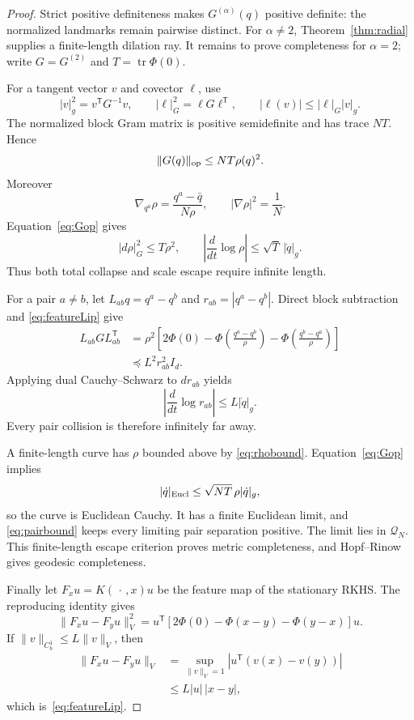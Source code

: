 \documentclass[11pt]{article}
\newcommand{\Q}{\mathcal{Q}}
\begin{document}
\begin{proof}
Strict positive definiteness makes \(G^{(\alpha)}(q)\) positive definite:
the normalized landmarks remain pairwise distinct.  For \(\alpha\ne2\),
Theorem~\ref{thm:radial} supplies a finite-length dilation ray.  It remains
to prove completeness for \(\alpha=2\); write \(G=G^{(2)}\) and
\(T=\operatorname{tr}\Phi(0)\).

For a tangent vector \(v\) and covector \(\ell\), use
\[
 |v|_g^2=v^{\mathsf T}G^{-1}v,
 \qquad |\ell|_G^2=\ell G\ell^{\mathsf T},
 \qquad |\ell(v)|\le |\ell|_G|v|_g.
\]
The normalized block Gram matrix is positive semidefinite and has trace
\(NT\).  Hence
\begin{equation}
 \|G(q)\|_{\rm op}\le NT\rho(q)^2.
 \label{eq:Gop}
\end{equation}
Moreover
\[
 \nabla_{q^a}\rho=\frac{q^a-\bar q}{N\rho},
 \qquad |\nabla\rho|^2=\frac1N.
\]
Equation~\eqref{eq:Gop} gives
\begin{equation}
 |d\rho|_G^2\le T\rho^2,
 \qquad
 \left|\frac d{dt}\log\rho\right|
 \le\sqrt T\,|\dot q|_g.
 \label{eq:rhobound}
\end{equation}
Thus both total collapse and scale escape require infinite length.

For a pair \(a\ne b\), let \(L_{ab}q=q^a-q^b\) and
\(r_{ab}=|q^a-q^b|\).  Direct block subtraction and
\eqref{eq:featureLip} give
\[
\begin{aligned}
 L_{ab}GL_{ab}^{\mathsf T}
 &=\rho^2\left[
 2\Phi(0)-\Phi\left(\frac{q^a-q^b}{\rho}\right)
 -\Phi\left(\frac{q^b-q^a}{\rho}\right)\right]\\
 &\preccurlyeq L^2r_{ab}^2I_d.
\end{aligned}
\]
Applying dual Cauchy--Schwarz to \(dr_{ab}\) yields
\begin{equation}
 \left|\frac d{dt}\log r_{ab}\right|
 \le L|\dot q|_g.
 \label{eq:pairbound}
\end{equation}
Every pair collision is therefore infinitely far away.

A finite-length curve has \(\rho\) bounded above by
\eqref{eq:rhobound}.  Equation~\eqref{eq:Gop} implies
\[
 |\dot q|_{\rm Eucl}
 \le\sqrt{NT}\,\rho|\dot q|_g,
\]
so the curve is Euclidean Cauchy.  It has a finite Euclidean limit, and
\eqref{eq:pairbound} keeps every limiting pair separation positive.  The
limit lies in \(\Q_N\).  This finite-length escape criterion proves metric
completeness, and Hopf--Rinow gives geodesic completeness.

Finally let \(F_xu=K(\,\cdot\,,x)u\) be the feature map of the stationary
RKHS.  The reproducing identity gives
\[
 \|F_xu-F_yu\|_V^2
 =u^{\mathsf T}
 [2\Phi(0)-\Phi(x-y)-\Phi(y-x)]u.
\]
If \(\|v\|_{C_b^1}\le L\|v\|_V\), then
\[
\begin{aligned}
 \|F_xu-F_yu\|_V
 &=\sup_{\|v\|_V=1}|u^{\mathsf T}(v(x)-v(y))|\\
 &\le L|u|\,|x-y|,
\end{aligned}
\]
which is~\eqref{eq:featureLip}.
\end{proof}
\end{document}

